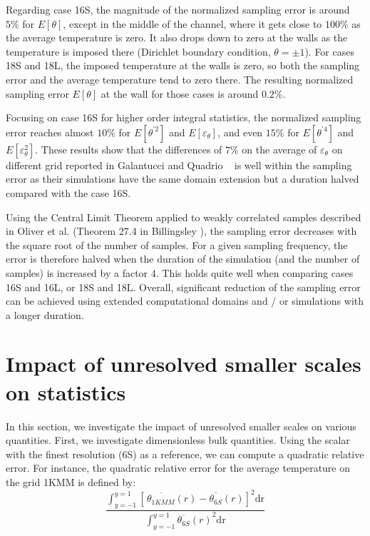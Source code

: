 \documentclass[review]{elsarticle}
\newcommand{\gqcite}{Galantucci and Quadrio \cite{galantucci2010very}}
\newcommand{\epst}{\varepsilon_\theta}
\begin{document}
Regarding case 16S, the magnitude of the normalized sampling error is around $5\%$ for $E\left[\theta\right]$, except in the middle of the channel, where it gets close to $100\%$ as the average temperature is zero. It also drops down to zero at the walls as the temperature is imposed there (Dirichlet boundary condition, $\theta = \pm 1$). For cases 18S and 18L, the imposed temperature at the walls is zero, so both the sampling error and the average temperature tend to zero there. The resulting normalized sampling error $E\left[\theta\right]$ at the wall for those cases is around $0.2\%$.

Focusing on case 16S for higher order {\color{red}integral} statistics, the normalized sampling error reaches almost $10\%$ for $E\left[ \theta^{\prime2} \right]$ and $E\left[\epst\right]$, and even $15\%$ for $E\left[ \theta^{\prime4} \right]$ and $E\left[\epst^2\right]$. These results show that the differences of $7\%$ on the average of $\epst$ on different grid reported in \gqcite ~ is well within the sampling error as their simulations have the same domain extension but a duration halved compared with the case 16S.

Using the Central Limit Theorem applied to weakly correlated samples described in Oliver et al. \cite{oliver2014estimating} (Theorem 27.4 in Billingsley \cite{billingsley2008probability}), the sampling error decreases with the square root of the number of samples. For a given sampling frequency, the error is therefore halved when the duration of the simulation (and the number of samples) is increased by a factor $4$. This holds quite well when comparing cases 16S and 16L, or 18S and 18L. Overall, significant reduction of the sampling error can be achieved using extended computational domains and / or simulations with a longer duration.

\section{Impact of {\color{red}unresolved} smaller scales on statistics}

In this section, we investigate the impact of {\color{red}unresolved} smaller scales on various quantities. First, we investigate dimensionless bulk quantities. Using the scalar with the finest resolution (6S) as a reference, we can compute a quadratic relative error. For instance, the quadratic relative error for the average temperature on the grid 1KMM is defined by:
\begin{equation}
\frac{\int_{y=-1}^{y=1}\left[\,\overline{\theta_{1KMM}}\left(r\right) - \overline{\theta_{6S}}\left(r\right)\right]^2\mbox{dr}}{\int_{y=-1}^{y=1}{\overline{\theta_{6S}}\left(r\right)}^2\mbox{dr}}
\end{equation}
\end{document}
